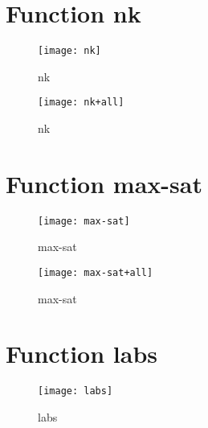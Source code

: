 \newpage

\section{Function nk}
\begin{center}

\end{center}

\begin{center}
\begin{figure}[h]
\centering
\texttt{[image: nk]}
\caption{nk}
\end{figure}
\end{center}

\begin{center}
\begin{figure}[h]
\centering
\texttt{[image: nk+all]}
\caption{nk}
\end{figure}
\end{center}

\newpage

\section{Function max-sat}
\begin{center}

\end{center}

\begin{center}
\begin{figure}[h]
\centering
\texttt{[image: max-sat]}
\caption{max-sat}
\end{figure}
\end{center}

\begin{center}
\begin{figure}[h]
\centering
\texttt{[image: max-sat+all]}
\caption{max-sat}
\end{figure}
\end{center}

\newpage

\section{Function labs}
\begin{center}

\end{center}

\begin{center}
\begin{figure}[h]
\centering
\texttt{[image: labs]}
\caption{labs}
\end{figure}
\end{center}

